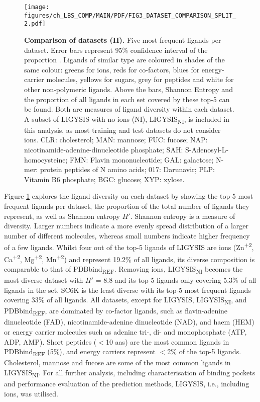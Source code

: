 \begin{figure}[ht!]
    \centering
    \texttt{[image: figures/ch\_LBS\_COMP/MAIN/PDF/FIG3\_DATASET\_COMPARISON\_SPLIT\_2.pdf]}
    \caption[Comparison of datasets (II)]{\textbf{Comparison of datasets (II).} Five most frequent ligands per dataset. Error bars represent 95\% confidence interval of the proportion \cite{WILSON_197_PROP_CI}. Ligands of similar type are coloured in shades of the same colour: greens for ions, reds for co-factors, blues for energy-carrier molecules, yellows for sugars, grey for peptides and white for other non-polymeric ligands. Above the bars, Shannon Entropy and the proportion of all ligands in each set covered by these top-5 can be found. Both are measures of ligand diversity within each dataset. A subset of LIGYSIS with no ions (NI), LIGYSIS\textsubscript{NI}, is included in this analysis, as most training and test datasets do not consider ions. CLR: cholesterol; MAN: mannose; FUC: fucose; NAP: nicotinamide-adenine-dinucleotide phosphate; SAH: S-Adenosyl-L-homocysteine; FMN: Flavin mononucleotide; GAL: galactose; N-mer: protein peptides of N amino acids; 017: Darunavir; PLP: Vitamin B6 phosphate; BGC: glucose; XYP: xylose.}
    \label{fig:dataset_comp_2}
\end{figure}

Figure \ref{fig:dataset_comp_2} explores the ligand diversity on each dataset by showing the top-5 most frequent ligands per dataset, the proportion of the total number of ligands they represent, as well as Shannon entropy $H'$. Shannon entropy is a measure of diversity. Larger numbers indicate a more evenly spread distribution of a larger number of different molecules, whereas small numbers indicate higher frequency of a few ligands. Whilst four out of the top-5 ligands of LIGYSIS are ions (Zn\textsuperscript{+2}, Ca\textsuperscript{+2}, Mg\textsuperscript{+2}, Mn\textsuperscript{+2}) and represent 19.2\% of all ligands, its diverse composition is comparable to that of PDBbind\textsubscript{REF}. Removing ions, LIGYSIS\textsubscript{NI} becomes the most diverse dataset with $H'$ = 8.8 and its top-5 ligands only covering 5.3\% of all ligands in the set. SC6K is the least diverse with its top-5 most frequent ligands covering 33\% of all ligands. All datasets, except for LIGYSIS, LIGYSIS\textsubscript{NI}, and PDBbind\textsubscript{REF}, are dominated by co-factor ligands, such as flavin-adenine dinucleotide (FAD), nicotinamide-adenine dinucleotide (NAD), and haem (HEM) or energy carrier molecules such as adenine tri-, di- and monophosphate (ATP, ADP, AMP). Short peptides ($<$10 aas) are the most common ligands in PDBbind\textsubscript{REF} (5\%), and energy carriers represent $<$2\% of the top-5 ligands. Cholesterol, mannose and fucose are some of the most common ligands in LIGYSIS\textsubscript{NI}. For all further analysis, including characterisation of binding pockets and performance evaluation of the prediction methods, LIGYSIS, i.e., including ions, was utilised.

